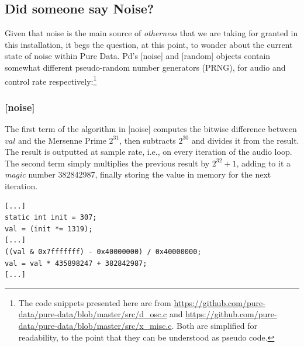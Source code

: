 \documentclass{nime-alternate}
\begin{document}
\subsection{Did someone say Noise?}
Given that noise is the main source of \textit{otherness} that we are taking for granted in this installation, it begs the question, at this point, to wonder about the current state of noise within Pure Data. Pd's [noise\ttt] and [random] objects contain somewhat different pseudo-random number generators (PRNG), for audio and control rate respectively:\footnote{The code snippets presented here are from \url{https://github.com/pure-data/pure-data/blob/master/src/d_osc.c} and \url{https://github.com/pure-data/pure-data/blob/master/src/x_misc.c}. Both are simplified for readability, to the point that they can be understood as pseudo code.}

\subsubsection{[noise\ttt]}
The first term of the algorithm in [noise\ttt] computes the bitwise difference between \(val\) and the Mersenne Prime \(2^{31}\), then subtracts \(2^{30}\) and divides it from the result. The result is outputted at sample rate, i.e., on every iteration of the audio loop. The second term simply multiplies the previous result by \(2^{32}+1\), adding to it a \textit{magic} number 382842987, finally storing the value in memory for the next iteration.
\begin{lstlisting}
[...]
static int init = 307;
val = (init *= 1319);
[...]
((val & 0x7fffffff) - 0x40000000) / 0x40000000;
val = val * 435898247 + 382842987;
[...]
\end{lstlisting}
\end{document}
